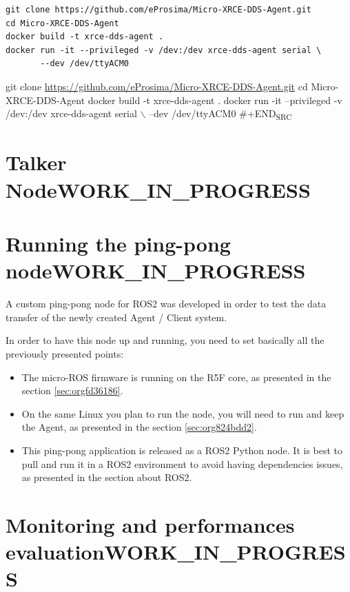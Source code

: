 \documentclass[10pt]{article}
\begin{document}
\begin{verbatim}
git clone https://github.com/eProsima/Micro-XRCE-DDS-Agent.git
cd Micro-XRCE-DDS-Agent
docker build -t xrce-dds-agent .
docker run -it --privileged -v /dev:/dev xrce-dds-agent serial \
       --dev /dev/ttyACM0
\end{verbatim}


git clone \url{https://github.com/eProsima/Micro-XRCE-DDS-Agent.git}
cd Micro-XRCE-DDS-Agent
docker build -t xrce-dds-agent .
docker run -it --privileged -v /dev:/dev xrce-dds-agent serial $\backslash$
       --dev /dev/ttyACM0
\#+END\textsubscript{SRC}

\section{Talker Node\hfill{}\textsc{WORK\_IN\_PROGRESS}}
\label{sec:org8055a6e}

\clearpage
\section{Running the ping-pong node\hfill{}\textsc{WORK\_IN\_PROGRESS}}
\label{sec:org4b34d6f}
A custom ping-pong node for ROS2 was developed in order to test the data transfer of the newly created
Agent / Client system.

In order to have this node up and running, you need to set basically all the previously presented points:
\begin{itemize}
\item The micro-ROS firmware is running on the R5F core, as presented in the section \ref{sec:orgfd36186}.
\item On the same Linux you plan to run the node, you will need to run and keep the Agent, as presented
in the section \ref{sec:org824bdd2}.
\item This ping-pong application is released as a ROS2 Python node. It is best to pull and run it
in a ROS2 environment to avoid having dependencies issues, as presented in the section about ROS2.

\clearpage
\end{itemize}
\section{Monitoring and performances evaluation\hfill{}\textsc{WORK\_IN\_PROGRESS}}
\label{sec:org6daee1a}
\end{document}
